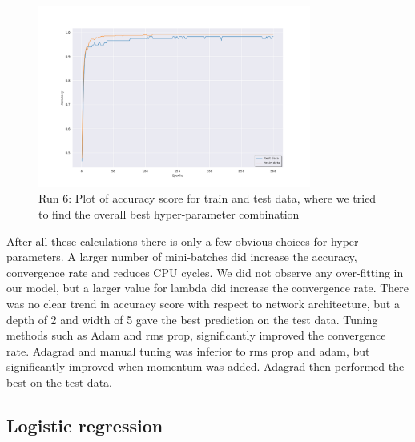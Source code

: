 \begin{figure}[H]
    \centering
    \includegraphics[width=0.8\textwidth]{Figures/PartD/d_line_best.png}
    \caption{Run 6: Plot of accuracy score for train and test data, where we
    tried to find the overall best hyper-parameter combination}  
    \label{fig:d_line_best} 
\end{figure}






After all these calculations there is only a few obvious choices for
hyper-parameters. A larger number of mini-batches did increase the accuracy,
convergence rate and reduces CPU cycles. We did not observe any over-fitting in 
our model, but a larger value for lambda did increase the convergence rate.
There was no clear trend in accuracy score with respect to network
architecture, but a depth of 2 and width of 5 gave the best prediction on the
test data. Tuning methods such as Adam and rms prop, significantly improved the
convergence rate. Adagrad and manual tuning was inferior to rms prop and adam,
but significantly improved when momentum was added. Adagrad then performed the
best on the test data. 


                            

\subsection{Logistic regression}


